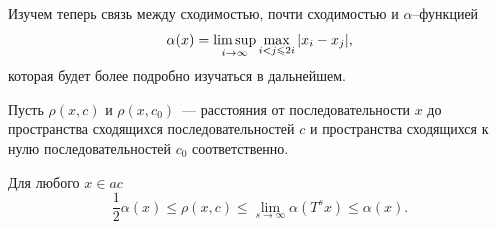 Изучем теперь связь между сходимостью, почти сходимостью и $\alpha$--функцией
\begin{equation}
	\alpha(x) = \varlimsup_{i\to\infty} \max_{i<j\leqslant 2i} |x_i - x_j|
	,
\end{equation}
которая будет более подробно изучаться в дальнейшем.

Пусть $\rho(x,c)$ и $\rho(x,c_0)$~--- расстояния от последовательности $x$ до пространства сходящихся последовательностей $c$
и пространства сходящихся к нулю последовательностей $c_0$ соответственно.

\begin{theorem}
	\label{thm:rho_x_c_leq_alpha_t_s_x_united}
	Для любого $x\in ac$
	\begin{equation}
		\frac{1}{2} \alpha(x) \leq \rho(x,c)\leq \lim_{s\to\infty} \alpha(T^s x)
		\leq \alpha(x)
		.
	\end{equation}
\end{theorem}

